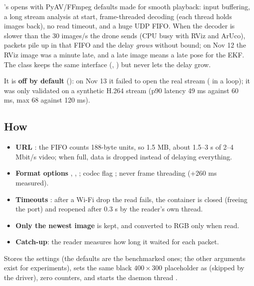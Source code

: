 's  opens  with PyAV/FFmpeg defaults made for
smooth playback: input buffering, a long stream analysis at start, frame-threaded decoding (each thread holds
images back), no read timeout, and a huge UDP FIFO. When the decoder is slower than the 30 images/s the drone sends
(CPU busy with RViz and ArUco), packets pile up in that FIFO and the delay \emph{grows} without bound; on Nov 12 the
RViz image was a minute late, and a late image means a late pose for the EKF. The class
 keeps the same interface (, ) but never lets the delay grow.

It is \textbf{off by default} (): on Nov 13 it failed to open the real stream
( in a loop); it was only validated on a synthetic H.264 stream (p90 latency 49 ms against
60 ms, max 68 against 120 ms).

\subsection{How}

\begin{itemize}[itemsep=1pt]
\item \textbf{URL} : the FIFO counts 188-byte units,
so 1.5 MB, about 1.5--3 s of 2--4 Mbit/s video; when full, data is dropped instead of delaying everything.
\item \textbf{Format options} , , ; codec flag
; never frame threading (+260 ms measured).
\item \textbf{Timeouts} : after a Wi-Fi drop the read fails, the container is closed
(freeing the port) and reopened after 0.3 s by the reader's own thread.
\item \textbf{Only the newest image} is kept, and converted to RGB only when read.
\item \textbf{Catch-up}: the reader measures how long it waited for each packet.
\end{itemize}

Stores the settings (the defaults are the benchmarked ones; the other arguments exist for experiments), sets the
same black $400\times300$ placeholder as  (skipped by the driver), zero counters, and starts the
daemon thread .


